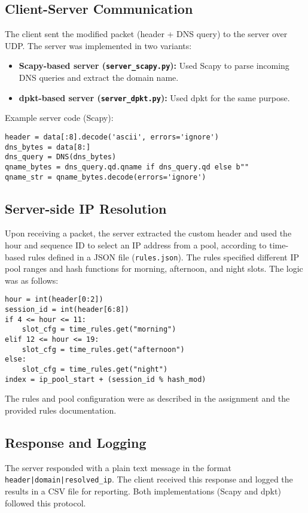 \documentclass[10pt,a4paper]{report}
\begin{document}
\subsection{Client-Server Communication}
The client sent the modified packet (header + DNS query) to the server over UDP. The server was implemented in two variants:
\begin{itemize}
    \item \textbf{Scapy-based server (\texttt{server\_scapy.py}):} Used Scapy to parse incoming DNS queries and extract the domain name.
    \item \textbf{dpkt-based server (\texttt{server\_dpkt.py}):} Used dpkt for the same purpose.
\end{itemize}
Example server code (Scapy):
\begin{verbatim}
header = data[:8].decode('ascii', errors='ignore')
dns_bytes = data[8:]
dns_query = DNS(dns_bytes)
qname_bytes = dns_query.qd.qname if dns_query.qd else b""
qname_str = qname_bytes.decode(errors='ignore')
\end{verbatim}


\subsection{Server-side IP Resolution}
Upon receiving a packet, the server extracted the custom header and used the hour and sequence ID to select an IP address from a pool, according to time-based rules defined in a JSON file (\texttt{rules.json}). The rules specified different IP pool ranges and hash functions for morning, afternoon, and night slots. The logic was as follows:
\begin{verbatim}
hour = int(header[0:2])
session_id = int(header[6:8])
if 4 <= hour <= 11:
    slot_cfg = time_rules.get("morning")
elif 12 <= hour <= 19:
    slot_cfg = time_rules.get("afternoon")
else:
    slot_cfg = time_rules.get("night")
index = ip_pool_start + (session_id % hash_mod)
\end{verbatim}
The rules and pool configuration were as described in the assignment and the provided rules documentation.

\subsection{Response and Logging}
The server responded with a plain text message in the format \texttt{header|domain|resolved\_ip}. The client received this response and logged the results in a CSV file for reporting. Both implementations (Scapy and dpkt) followed this protocol.
\end{document}
